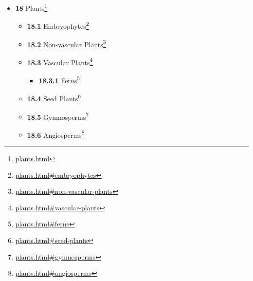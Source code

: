 \documentclass[
]{article}
\providecommand{\tightlist}{%
  \setlength{\itemsep}{0pt}\setlength{\parskip}{0pt}}
\providecommand{\tightlist}{%
  \setlength{\itemsep}{0pt}\setlength{\parskip}{0pt}}
\let\rmarkdownfootnote\footnote%
\def\footnote{\protect\rmarkdownfootnote}
\renewcommand{\href}[2]{#2\footnote{\url{#1}}}
\theoremstyle{definition}
\theoremstyle{definition}
\theoremstyle{definition}
\theoremstyle{remark}
\begin{document}
\begin{itemize}
\begin{itemize}
    \begin{itemize}
    \tightlist
    \item
      \href{fungi.html\#asexual-reproduction}{\emph{}\textbf{17.3.1}
      Asexual reproduction}
    \item
      \href{fungi.html\#sexual-reproduction-1}{\emph{}\textbf{17.3.2}
      Sexual reproduction}
    \item
      \href{fungi.html\#spore-dispersal}{\emph{}\textbf{17.3.3} Spore
      dispersal}
    \end{itemize}
  \item
    \href{fungi.html\#evolution-of-fungi}{\emph{}\textbf{17.4} Evolution
    of Fungi}
  \item
    \href{fungi.html\#fungus-like-organisms}{\emph{}\textbf{17.5}
    Fungus-like organisms}
  \item
    \href{fungi.html\#ecology-of-fungi}{\emph{}\textbf{17.6} Ecology of
    Fungi}

    \begin{itemize}
    \tightlist
    \item
      \href{fungi.html\#symbiosis}{\emph{}\textbf{17.6.1} Symbiosis}
    \end{itemize}
  \item
    \href{fungi.html\#fungi-as-pathogens-and-parasites}{\emph{}\textbf{17.7}
    Fungi as Pathogens And Parasites}
  \item
    \href{fungi.html\#mycotoxins}{\emph{}\textbf{17.8} Mycotoxins}
  \end{itemize}
\item
  \href{plants.html}{\emph{}\textbf{18} Plants}

  \begin{itemize}
  \tightlist
  \item
    \href{plants.html\#embryophytes}{\emph{}\textbf{18.1} Embryophytes}
  \item
    \href{plants.html\#non-vascular-plants}{\emph{}\textbf{18.2}
    Non-vascular Plants}
  \item
    \href{plants.html\#vascular-plants}{\emph{}\textbf{18.3} Vascular
    Plants}

    \begin{itemize}
    \tightlist
    \item
      \href{plants.html\#ferns}{\emph{}\textbf{18.3.1} Ferns}
    \end{itemize}
  \item
    \href{plants.html\#seed-plants}{\emph{}\textbf{18.4} Seed Plants}
  \item
    \href{plants.html\#gymnosperms}{\emph{}\textbf{18.5} Gymnosperms}
  \item
    \href{plants.html\#angiosperms}{\emph{}\textbf{18.6} Angiosperms}


\end{itemize}
\end{itemize}
\end{document}
